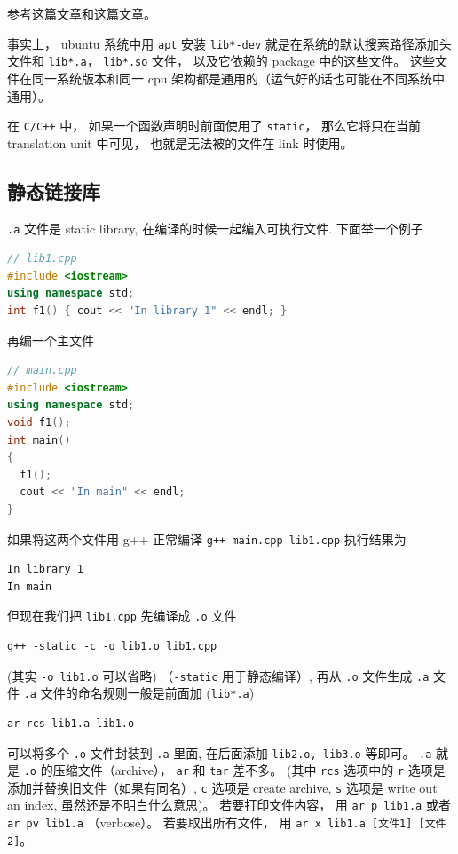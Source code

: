 

参考\href{https://blog.feabhas.com/2014/04/static-and-dynamic-libraries-on-linux/}{这篇文章}和\href{https://gcc.gnu.org/onlinedocs/gcc/Link-Options.html}{这篇文章}。

事实上， ubuntu 系统中用 \verb`apt` 安装 \verb`lib*-dev` 就是在系统的默认搜索路径添加头文件和 \verb`lib*.a`， \verb`lib*.so` 文件， 以及它依赖的 package 中的这些文件。 这些文件在同一系统版本和同一 cpu 架构都是通用的（运气好的话也可能在不同系统中通用）。

在 \verb`C/C++` 中， 如果一个函数声明时前面使用了 \verb`static`， 那么它将只在当前 translation unit 中可见， 也就是无法被的文件在 link 时使用。

\subsection{静态链接库}

\verb`.a` 文件是 static library, 在编译的时候一起编入可执行文件. 下面举一个例子

\begin{lstlisting}[language=cpp]
// lib1.cpp
#include <iostream>
using namespace std;
int f1() { cout << "In library 1" << endl; }
\end{lstlisting}

再编一个主文件

\begin{lstlisting}[language=cpp]
// main.cpp
#include <iostream>
using namespace std;
void f1();
int main()
{
  f1();
  cout << "In main" << endl;
}
\end{lstlisting}

如果将这两个文件用 g++ 正常编译 \verb`g++ main.cpp lib1.cpp` 执行结果为
\begin{lstlisting}[language=none]
In library 1
In main
\end{lstlisting}
但现在我们把 \verb`lib1.cpp` 先编译成 \verb`.o` 文件

\begin{lstlisting}[language=none]
g++ -static -c -o lib1.o lib1.cpp
\end{lstlisting}

(其实 \verb`-o lib1.o` 可以省略) （\verb`-static` 用于静态编译）, 再从 \verb`.o` 文件生成 \verb`.a` 文件 \verb`.a` 文件的命名规则一般是前面加 (\verb`lib*.a`)

\begin{lstlisting}[language=none]
ar rcs lib1.a lib1.o
\end{lstlisting}
可以将多个 \verb`.o` 文件封装到 \verb`.a` 里面, 在后面添加 \verb`lib2.o, lib3.o` 等即可。 \verb`.a` 就是 \verb`.o` 的压缩文件（archive）， \verb`ar` 和 \verb`tar` 差不多。 (其中 \verb`rcs` 选项中的 \verb`r` 选项是添加并替换旧文件（如果有同名）, \verb`c` 选项是 create archive, \verb`s` 选项是 write out an index, 虽然还是不明白什么意思)。 若要打印文件内容， 用 \verb`ar p lib1.a` 或者 \verb`ar pv lib1.a` （verbose）。 若要取出所有文件， 用 \verb`ar x lib1.a [文件1] [文件2]`。

